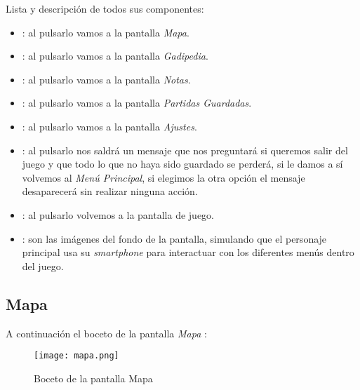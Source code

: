 	         Lista y descripción de todos sus componentes:
	         \begin{itemize}
	         \item {}: al pulsarlo vamos a la pantalla \emph{Mapa}. 
	         \item {}: al pulsarlo vamos a la pantalla \emph{Gadipedia}. 
	         \item {}: al pulsarlo vamos a la pantalla \emph{Notas}.
	         \item {}: al pulsarlo vamos a la pantalla \emph{Partidas Guardadas}.
	         \item {}: al pulsarlo vamos a la pantalla \emph{Ajustes}.
	         \item {}: al pulsarlo nos saldrá un mensaje que nos preguntará si queremos salir del juego y que todo lo que no haya sido guardado se perderá, si le damos a sí volvemos al \emph{Menú Principal}, si elegimos la otra opción el mensaje desaparecerá sin realizar ninguna acción.    
	         \item {}: al pulsarlo volvemos a la pantalla de juego.
	         \item {}: son las imágenes del fondo de la pantalla, simulando que el personaje principal usa su \emph{smartphone} para interactuar con los diferentes menús dentro del juego.
	         \end{itemize}
        
            \newpage
            \subsection{Mapa}
            A continuación el boceto de la pantalla \emph{Mapa} :
            
            \begin{figure}[H]
            	\begin{center}
            		\texttt{[image: mapa.png]}
            	\end{center}
            	\caption{Boceto de la pantalla Mapa}
            	\label{fig:mapa}
            \end{figure}
            
